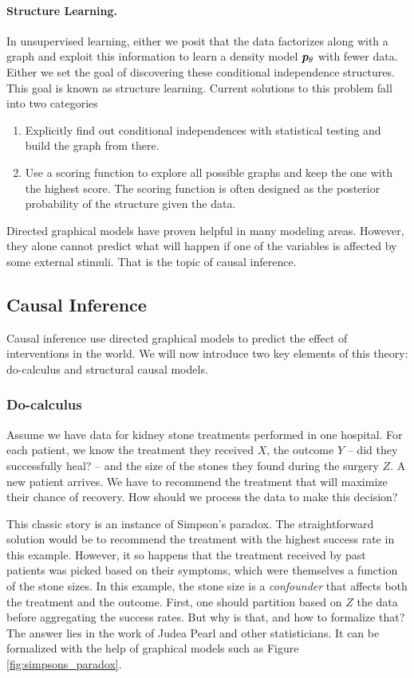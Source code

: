 \paragraph{Structure Learning.}
In unsupervised learning, either we posit that the data factorizes along with a graph and exploit this information to learn a density model $\bm{p}_{\theta}$ with fewer data. Either we set the goal of discovering these conditional independence structures. This goal is known as structure learning. Current solutions to this problem fall into two categories
\begin{enumerate}
	\item Explicitly find out conditional independences with statistical testing and build the graph from there.
	\item Use a scoring function to explore all possible graphs and keep the one with the highest score. The scoring function is often designed as the posterior probability of the structure given the data.
\end{enumerate}

Directed graphical models have proven helpful in many modeling areas. However, they alone cannot predict what will happen if one of the variables is affected by some external stimuli. That is the topic of causal inference.

\subsection{Causal Inference}
\label{ssec:SCM}

Causal inference use directed graphical models to predict the effect of interventions in the world. We will now introduce two key elements of this theory: do-calculus and structural causal models.

\subsubsection{Do-calculus}
Assume we have data for kidney stone treatments performed in one hospital. 
For each patient, we know the treatment they received $X$, the outcome $Y$ -- did they successfully heal? -- and the size of the stones they found during the surgery $Z$. 
A new patient arrives. We have to recommend the treatment that will maximize their chance of recovery.  
How should we process the data to make this decision?

This classic story is an instance of Simpson's paradox. 
The straightforward solution would be to recommend the treatment with the highest success rate in this example. 
However, it so happens that the treatment received by past patients was picked based on their symptoms, which were themselves a function of the stone sizes. 
In this example, the stone size is a \textit{confounder} that affects both the treatment and the outcome. 
First, one should partition based on $Z$ the data before aggregating the success rates. But why is that, and how to formalize that? The answer lies in the work of Judea Pearl \citep{pearl2009causality} and other statisticians. It can be formalized with the help of graphical models such as Figure \ref{fig:simpsons_paradox}.

